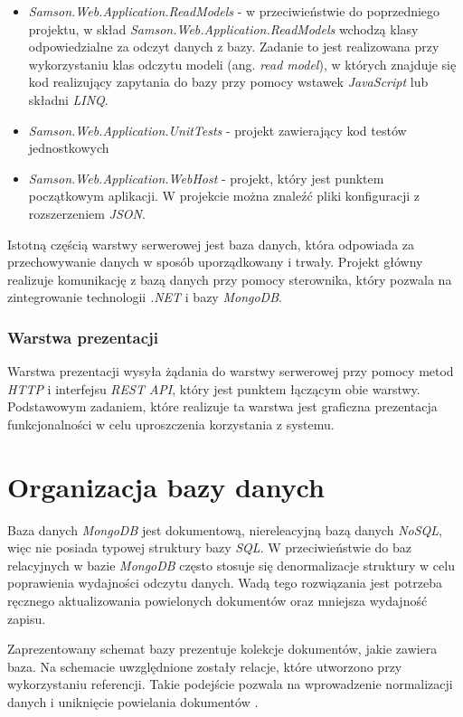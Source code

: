 \documentclass[a4paper,twoside,12pt]{book}
\newcommand{\obcy}[1]{\emph{#1}}
\newcommand{\ang}[1]{{\selectlanguage{british}\obcy{#1}}}
\begin{document}
{\begin{itemize}
	\item \textit{Samson.Web.Application.ReadModels} - w przeciwieństwie do poprzedniego projektu, w skład \textit{Samson.Web.Application.ReadModels} wchodzą klasy odpowiedzialne za odczyt danych z bazy. Zadanie to jest realizowana przy wykorzystaniu klas odczytu modeli (ang. \ang{read model}), w których znajduje się kod realizujący zapytania do bazy przy pomocy wstawek \textit{JavaScript} lub składni \textit{LINQ}.
	\item \textit{Samson.Web.Application.UnitTests} - projekt zawierający kod testów jednostkowych
	\item \textit{Samson.Web.Application.WebHost} - projekt, który jest punktem początkowym aplikacji. W projekcie można znaleźć pliki konfiguracji z rozszerzeniem \textit{JSON}.
\end{itemize}
Istotną częścią warstwy serwerowej jest baza danych, która odpowiada za przechowywanie danych w sposób uporządkowany i trwały. Projekt główny realizuje komunikację z bazą danych przy pomocy sterownika, który pozwala na zintegrowanie technologii \textit{.NET} i bazy \textit{MongoDB}.

\subsubsection{Warstwa prezentacji}
Warstwa prezentacji wysyła żądania do warstwy serwerowej przy pomocy metod \textit{HTTP} i interfejsu \textit{REST API}, który jest punktem łączącym obie warstwy. Podstawowym zadaniem, które realizuje ta warstwa jest graficzna prezentacja funkcjonalności w celu uproszczenia korzystania z systemu.

\section{Organizacja bazy danych}
Baza danych \textit{MongoDB} jest dokumentową, niereleacyjną bazą danych \textit{NoSQL}, więc nie posiada typowej struktury bazy \textit{SQL}. W przeciwieństwie do baz relacyjnych w bazie \textit{MongoDB} często stosuje się denormalizacje struktury w celu poprawienia wydajności odczytu danych. Wadą tego rozwiązania jest potrzeba ręcznego aktualizowania powielonych dokumentów oraz mniejsza wydajność zapisu.

Zaprezentowany schemat bazy prezentuje kolekcje dokumentów, jakie zawiera baza. Na schemacie uwzględnione zostały relacje, które utworzono przy wykorzystaniu referencji. Takie podejście pozwala na wprowadzenie normalizacji danych i uniknięcie powielania dokumentów \cite{bib:mongoRelations}.

}
\end{document}
